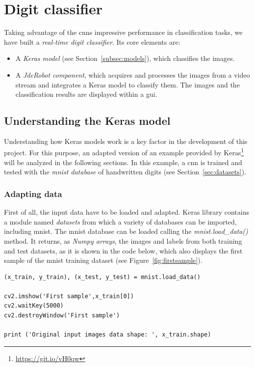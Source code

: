 \chapter{Digit classifier}\label{ch:digitclass}
Taking advantage of the \glspl{cnn} impressive performance in classification tasks, we have built a \emph{real-time digit classifier}. Its core elements are:
\begin{itemize}
	\item A \emph{Keras model} (see Section~\ref{subsec:models}), which classifies the images.
	\item A \emph{JdeRobot component}, which acquires and processes the images from a video stream and integrates a Keras model to classify them. The images and the classification results are displayed within a \gls{gui}.
\end{itemize}

\section{Understanding the Keras model}\label{sec:understanding}
Understanding how Keras models work is a key factor in the development of this project. For this purpose, an adapted version of an example provided by Keras\footnote{\url{https://git.io/vH0qw}} will be analyzed in the following sections. In this example, a \gls{cnn} is trained and tested with the \emph{\gls{mnist} database} of handwritten digits (see Section~\ref{sec:datasets}).

\subsection{Adapting data}\label{subsec:adaptdata}
First of all, the input data have to be loaded and adapted. Keras library contains a module named \textit{datasets} from which a variety of databases can be imported, including \gls{mnist}. The \gls{mnist} database can be loaded calling the \textit{mnist.load\_data()} method. It returns, as \emph{Numpy arrays}, the images and labels from both training and test datasets, as it is shown in the code below, which also displays the first sample of the \gls{mnist} training dataset (see Figure~\ref{fig:firstsample}).
\begin{lstlisting}
(x_train, y_train), (x_test, y_test) = mnist.load_data()

cv2.imshow('First sample',x_train[0])
cv2.waitKey(5000)
cv2.destroyWindow('First sample')

print ('Original input images data shape: ', x_train.shape) 
\end{lstlisting}

